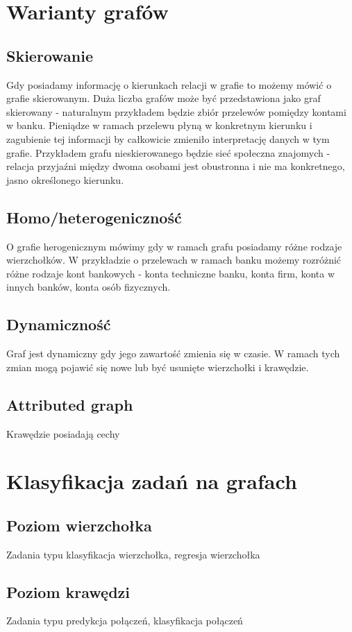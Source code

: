 \documentclass[12pt,a4paper,twoside,openany]{book}
\begin{document}
\section{Warianty grafów}
\subsection{Skierowanie}
Gdy posiadamy informację o kierunkach relacji w grafie to możemy mówić o grafie skierowanym.
Duża liczba grafów może być przedstawiona jako graf skierowany -
naturalnym przykładem będzie zbiór przelewów pomiędzy kontami w banku.
Pieniądze w ramach przelewu płyną w konkretnym kierunku i zagubienie tej informacji by całkowicie zmieniło
interpretację danych w tym grafie. Przykładem grafu nieskierowanego będzie
sieć społeczna znajomych - relacja przyjaźni między dwoma osobami jest obustronna i nie ma konkretnego, jasno określonego kierunku.

\subsection{Homo/heterogeniczność}
O grafie herogenicznym mówimy gdy w ramach grafu posiadamy różne rodzaje wierzchołków.
W przykładzie o przelewach w ramach banku możemy rozróżnić różne rodzaje
kont bankowych - konta techniczne banku, konta firm,
konta w innych banków, konta osób fizycznych.

\subsection{Dynamiczność}
Graf jest dynamiczny gdy jego zawartość zmienia się w czasie.
W ramach tych zmian mogą pojawić się nowe lub być usunięte wierzchołki i krawędzie.

\subsection{Attributed graph}
Krawędzie posiadają cechy

\section{Klasyfikacja zadań na grafach}
\subsection{Poziom wierzchołka}
Zadania typu klasyfikacja wierzchołka, regresja wierzchołka
\subsection{Poziom krawędzi}
Zadania typu predykcja połączeń, klasyfikacja połączeń
\end{document}
